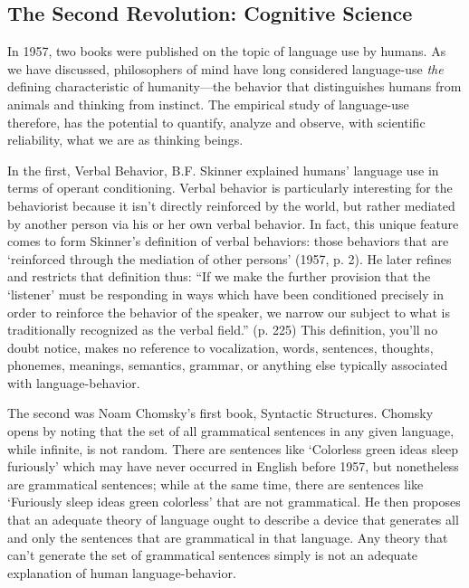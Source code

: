 \begin{refsection}
\subsection{The Second Revolution: Cognitive Science}
\label{thesecondrevolution:cognitivescience}

In 1957, two books were published on the topic of language use by humans. As we have discussed, philosophers of mind have long considered language-use \emph{the} defining characteristic of humanity---the behavior that distinguishes humans from animals and thinking from instinct. The empirical study of language-use therefore, has the potential to quantify, analyze and observe, with scientific reliability, what we are as thinking beings.

In the first, Verbal Behavior, B.F. Skinner explained humans' language use in terms of operant conditioning. Verbal behavior is particularly interesting for the behaviorist because it isn't directly reinforced by the world, but rather mediated by another person via his or her own verbal behavior. In fact, this unique feature comes to form Skinner's definition of verbal behaviors: those behaviors that are `reinforced through the mediation of other persons' (1957, p. 2). He later refines and restricts that definition thus: ``If we make the further provision that the `listener' must be responding in ways which have been conditioned precisely in order to reinforce the behavior of the speaker, we narrow our subject to what is traditionally recognized as the verbal field.'' (p. 225) This definition, you'll no doubt notice, makes no reference to vocalization, words, sentences, thoughts, phonemes, meanings, semantics, grammar, or anything else typically associated with language-behavior.

The second was Noam Chomsky's first book, Syntactic Structures. Chomsky opens by noting that the set of all grammatical sentences in any given language, while infinite, is not random. There are sentences like `Colorless green ideas sleep furiously' which may have never occurred in English before 1957, but nonetheless are grammatical sentences; while at the same time, there are sentences like `Furiously sleep ideas green colorless' that are not grammatical. He then proposes that an adequate theory of language ought to describe a device that generates all and only the sentences that are grammatical in that language. Any theory that can't generate the set of grammatical sentences simply is not an adequate explanation of human language-behavior.


\end{refsection}
